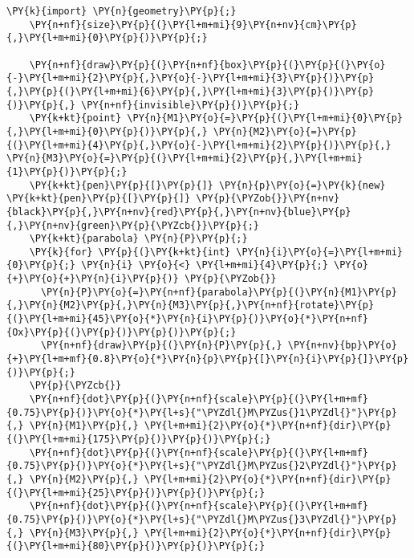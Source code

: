 \begin{Verbatim}[commandchars=\\\{\}]
    \PY{k}{import} \PY{n}{geometry}\PY{p}{;}
    \PY{n+nf}{size}\PY{p}{(}\PY{l+m+mi}{9}\PY{n+nv}{cm}\PY{p}{,}\PY{l+m+mi}{0}\PY{p}{)}\PY{p}{;}

    \PY{n+nf}{draw}\PY{p}{(}\PY{n+nf}{box}\PY{p}{(}\PY{p}{(}\PY{o}{-}\PY{l+m+mi}{2}\PY{p}{,}\PY{o}{-}\PY{l+m+mi}{3}\PY{p}{)}\PY{p}{,}\PY{p}{(}\PY{l+m+mi}{6}\PY{p}{,}\PY{l+m+mi}{3}\PY{p}{)}\PY{p}{)}\PY{p}{,} \PY{n+nf}{invisible}\PY{p}{)}\PY{p}{;}
    \PY{k+kt}{point} \PY{n}{M1}\PY{o}{=}\PY{p}{(}\PY{l+m+mi}{0}\PY{p}{,}\PY{l+m+mi}{0}\PY{p}{)}\PY{p}{,} \PY{n}{M2}\PY{o}{=}\PY{p}{(}\PY{l+m+mi}{4}\PY{p}{,}\PY{o}{-}\PY{l+m+mi}{2}\PY{p}{)}\PY{p}{,} \PY{n}{M3}\PY{o}{=}\PY{p}{(}\PY{l+m+mi}{2}\PY{p}{,}\PY{l+m+mi}{1}\PY{p}{)}\PY{p}{;}
    \PY{k+kt}{pen}\PY{p}{[}\PY{p}{]} \PY{n}{p}\PY{o}{=}\PY{k}{new} \PY{k+kt}{pen}\PY{p}{[}\PY{p}{]} \PY{p}{\PYZob{}}\PY{n+nv}{black}\PY{p}{,}\PY{n+nv}{red}\PY{p}{,}\PY{n+nv}{blue}\PY{p}{,}\PY{n+nv}{green}\PY{p}{\PYZcb{}}\PY{p}{;}
    \PY{k+kt}{parabola} \PY{n}{P}\PY{p}{;}
    \PY{k}{for} \PY{p}{(}\PY{k+kt}{int} \PY{n}{i}\PY{o}{=}\PY{l+m+mi}{0}\PY{p}{;} \PY{n}{i} \PY{o}{<} \PY{l+m+mi}{4}\PY{p}{;} \PY{o}{+}\PY{o}{+}\PY{n}{i}\PY{p}{)} \PY{p}{\PYZob{}}
      \PY{n}{P}\PY{o}{=}\PY{n+nf}{parabola}\PY{p}{(}\PY{n}{M1}\PY{p}{,}\PY{n}{M2}\PY{p}{,}\PY{n}{M3}\PY{p}{,}\PY{n+nf}{rotate}\PY{p}{(}\PY{l+m+mi}{45}\PY{o}{*}\PY{n}{i}\PY{p}{)}\PY{o}{*}\PY{n+nf}{Ox}\PY{p}{(}\PY{p}{)}\PY{p}{)}\PY{p}{;}
      \PY{n+nf}{draw}\PY{p}{(}\PY{n}{P}\PY{p}{,} \PY{n+nv}{bp}\PY{o}{+}\PY{l+m+mf}{0.8}\PY{o}{*}\PY{n}{p}\PY{p}{[}\PY{n}{i}\PY{p}{]}\PY{p}{)}\PY{p}{;}
    \PY{p}{\PYZcb{}}
    \PY{n+nf}{dot}\PY{p}{(}\PY{n+nf}{scale}\PY{p}{(}\PY{l+m+mf}{0.75}\PY{p}{)}\PY{o}{*}\PY{l+s}{"\PYZdl{}M\PYZus{}1\PYZdl{}"}\PY{p}{,} \PY{n}{M1}\PY{p}{,} \PY{l+m+mi}{2}\PY{o}{*}\PY{n+nf}{dir}\PY{p}{(}\PY{l+m+mi}{175}\PY{p}{)}\PY{p}{)}\PY{p}{;}
    \PY{n+nf}{dot}\PY{p}{(}\PY{n+nf}{scale}\PY{p}{(}\PY{l+m+mf}{0.75}\PY{p}{)}\PY{o}{*}\PY{l+s}{"\PYZdl{}M\PYZus{}2\PYZdl{}"}\PY{p}{,} \PY{n}{M2}\PY{p}{,} \PY{l+m+mi}{2}\PY{o}{*}\PY{n+nf}{dir}\PY{p}{(}\PY{l+m+mi}{25}\PY{p}{)}\PY{p}{)}\PY{p}{;}
    \PY{n+nf}{dot}\PY{p}{(}\PY{n+nf}{scale}\PY{p}{(}\PY{l+m+mf}{0.75}\PY{p}{)}\PY{o}{*}\PY{l+s}{"\PYZdl{}M\PYZus{}3\PYZdl{}"}\PY{p}{,} \PY{n}{M3}\PY{p}{,} \PY{l+m+mi}{2}\PY{o}{*}\PY{n+nf}{dir}\PY{p}{(}\PY{l+m+mi}{80}\PY{p}{)}\PY{p}{)}\PY{p}{;}
\end{Verbatim}
